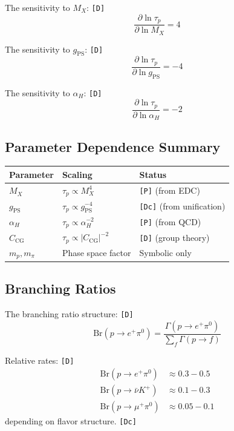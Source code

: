 \documentclass[11pt,a4paper]{article}
\newcommand{\tagD}{\textcolor{green!50!black}{\texttt{[D]}}}
\newcommand{\tagDc}{\textcolor{blue!70!black}{\texttt{[Dc]}}}
\newcommand{\tagP}{\textcolor{orange!80!black}{\texttt{[P]}}}
\theoremstyle{definition}
\begin{document}
The sensitivity to $M_X$: \tagD{}
\begin{equation}
\label{eq:sensitivity-mx}
\frac{\partial \ln \tau_p}{\partial \ln M_X} = 4
\end{equation}

The sensitivity to $g_{\text{PS}}$: \tagD{}
\begin{equation}
\label{eq:sensitivity-g}
\frac{\partial \ln \tau_p}{\partial \ln g_{\text{PS}}} = -4
\end{equation}

The sensitivity to $\alpha_H$: \tagD{}
\begin{equation}
\label{eq:sensitivity-ah}
\frac{\partial \ln \tau_p}{\partial \ln \alpha_H} = -2
\end{equation}

\subsection{Parameter Dependence Summary}
\label{subsec:param-dependence}

\begin{center}
\begin{tabular}{lll}
\toprule
Parameter & Scaling & Status \\
\midrule
$M_X$ & $\tau_p \propto M_X^4$ & \tagP{} (from EDC) \\
$g_{\text{PS}}$ & $\tau_p \propto g_{\text{PS}}^{-4}$ & \tagDc{} (from unification) \\
$\alpha_H$ & $\tau_p \propto \alpha_H^{-2}$ & \tagP{} (from QCD) \\
$C_{\text{CG}}$ & $\tau_p \propto |C_{\text{CG}}|^{-2}$ & \tagD{} (group theory) \\
$m_p, m_\pi$ & Phase space factor & Symbolic only \\
\bottomrule
\end{tabular}
\end{center}

\subsection{Branching Ratios}
\label{subsec:branching}

The branching ratio structure: \tagD{}
\begin{equation}
\label{eq:branching}
\text{Br}(p \to e^+ \pi^0) = \frac{\Gamma(p \to e^+ \pi^0)}{\sum_f \Gamma(p \to f)}
\end{equation}

Relative rates: \tagD{}
\begin{align}
\label{eq:br-epi0}
\text{Br}(p \to e^+ \pi^0) &\approx 0.3 - 0.5 \\
\label{eq:br-nuK}
\text{Br}(p \to \bar{\nu} K^+) &\approx 0.1 - 0.3 \\
\label{eq:br-mupi0}
\text{Br}(p \to \mu^+ \pi^0) &\approx 0.05 - 0.1
\end{align}
depending on flavor structure. \tagDc{}
\end{document}

